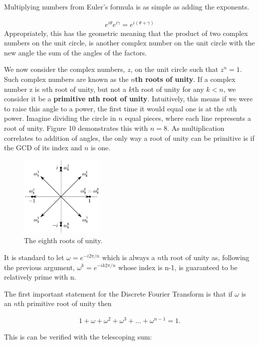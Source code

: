 \documentclass[DIV=calc, paper=a4, fontsize=11pt, twocolumn]{scrartcl}   %
\begin{document}
Multiplying numbers from Euler's formula is as simple as adding the exponents.

\begin{align}
e^{i\theta}e^{i\gamma} = e^{i(\theta+\gamma)}
\end{align}
Appropriately, this has the geometric meaning that the product of two complex numbers on the unit circle, is another complex number on the unit circle with the new angle the sum of the angles of the factors.
\par We now consider the complex numbers, $z$, on the unit circle such that $z^n = 1 $. Such complex numbers are known as the \textbf{$n$th roots of unity}. If a complex number z is $n$th root of unity, but not a $k$th root of unity for any $k<n$, we consider it be a \textbf{primitive nth root of unity}. Intuitively, this means if we were to raise this angle to a power, the first time it would equal one is at the $n$th power. Imagine dividing the circle in $n$ equal pieces, where each line represents a root of unity. Figure 10 demonstrates this with $n=8$. As multiplication correlates to addition of angles, the only way a root of unity can be primitive is if the GCD of its index and $n$ is one.

\begin{figure}[h]
\centering
\includegraphics[width=40mm]{figures/eighthroots.jpg}
\caption{The eighth roots of unity. }
\label{overflow}
\end{figure}


 It is standard to let $\omega = e^{-i2\pi/n}$ which is always a $n$th root of unity as, following the previous argument, $\omega^k = e^{-ik2\pi/n}$ whose index is n-1, is guaranteed to be relatively prime with n.


The first important statement for the Discrete Fourier Transform is that if $\omega$ is an $n$th primitive root of unity then

\begin{align}
1 + \omega + \omega^2 + \omega^3 + ... + \omega^{n-1} = 1.
\end{align}

This is can be verified with the telescoping sum:
\end{document}
